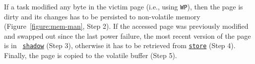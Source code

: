 

If a task modified any byte in the victim page (i.e., using \texttt{WP}), then
the page is dirty and its changes has to be persisted to non-volatile memory
(Figure~\ref{figure:mem-man}, Step 2).
If the accessed page was previously modified and swapped out since the last
power failure, the most recent version of the page is in {\tt
\underline{shadow}} (Step 3), otherwise it has to be retrieved from
{\tt \underline{store}} (Step 4).
Finally, the page is copied to the volatile buffer (Step 5).
%
%

